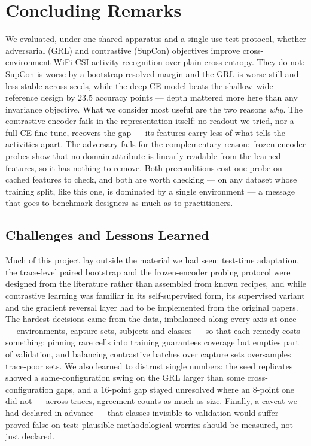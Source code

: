 
\section{Concluding Remarks}
\label{sec:conclusions}

We evaluated, under one shared apparatus and a single-use test protocol,
whether adversarial (GRL) and contrastive (SupCon) objectives improve
cross-environment WiFi CSI activity recognition over plain cross-entropy. They
do not: SupCon is worse by a bootstrap-resolved margin and the GRL is worse
still and less stable across seeds, while the deep CE model beats the
shallow--wide reference design by $23.5$ accuracy points --- depth mattered
more here than any invariance objective. What we consider most useful
are the two reasons \emph{why}. The contrastive
encoder fails in the representation itself: no readout we tried, nor a full CE
fine-tune, recovers the gap --- its features carry less of what tells the
activities apart. The adversary
fails for the complementary reason: frozen-encoder probes show that no domain
attribute is linearly readable from the learned features, so it has nothing to
remove. Both preconditions cost one probe on cached features to check, and
both are worth checking --- on any dataset whose training split, like this
one, is dominated by a single environment --- a message that goes to benchmark
designers as much as to practitioners.

\subsection{Challenges and Lessons Learned}

Much of this project lay outside the material we had seen: test-time
adaptation, the trace-level paired bootstrap and the frozen-encoder probing
protocol were designed from the literature rather than assembled from known
recipes, and while contrastive learning was familiar in its self-supervised
form, its supervised variant and the gradient reversal layer had to be
implemented from the original papers. The hardest decisions came
from the data, imbalanced along every axis at once --- environments, capture
sets, subjects and classes --- so that each remedy costs something: pinning
rare cells into training guarantees coverage but empties part of validation,
and balancing contrastive batches over capture sets oversamples trace-poor
sets. We also learned to distrust single numbers: the seed replicates showed a
same-configuration swing on the GRL larger than some cross-configuration gaps,
and a $16$-point gap stayed unresolved where an $8$-point one did not --- across
traces, agreement counts as much as size. Finally, a caveat we had declared in advance
--- that classes invisible to validation would suffer --- proved false on
test: plausible methodological worries should be measured, not just declared.

